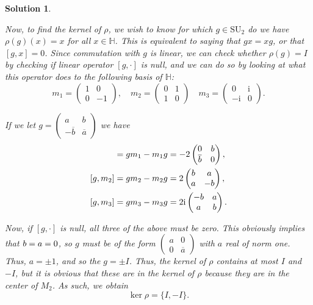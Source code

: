 \documentclass{article}
\theoremstyle{nonumberplain}
\newtheorem{sol}{Solution}
\newcommand{\I}{\mathrm{i}}
\newcommand{\conj}[1]{\overline{#1}}
\renewcommand{\lg}[1]{\mathrm{#1}}
\newcommand{\bbH}{\mathbb{H}}
\let\Im\relax
\DeclareMathOperator{\Im}{Im}
\let\Re\relax
\DeclareMathOperator{\Re}{Re}
\begin{document}
\begin{sol}
\begin{enumerate}
\smallskip

Now, to find the kernel of $\rho$, we wish to know for which $g \in \lg{SU}_2$ do we have $\rho(g)(x) = x$ for all $x \in \bbH$. This is equivalent to saying that $gx = xg$, or that $[g,x] = 0$. Since commutation with $g$ is linear, we can check whether $\rho(g) = I$ by checking if linear operator $[g,\cdot]$ is null, and we can do so by looking at what this operator does to the following basis of $\bbH$:
\begin{equation}
m_1 = \begin{pmatrix} 1 & 0 \\ 0 & -1 \end{pmatrix}, \quad m_2 = \begin{pmatrix}0&1\\1&0\end{pmatrix} \quad m_3 = \begin{pmatrix}0&\I\\-\I&0\end{pmatrix}.
\end{equation}

If we let $g = \left(\begin{smallmatrix} a & b \\ - \conj b & \conj a\end{smallmatrix}\right)$ we have
\begin{align}
[g, m_1] = g m_1 - m_1 g &= - 2 \begin{pmatrix} 0 & b \\ \conj b & 0 \end{pmatrix},\\
[g, m_2] = g m_2 - m_2 g &= 2 \begin{pmatrix} \Re b & \Im a \\  \Im a & - \Re b \end{pmatrix},\\
[g, m_3] = g m_3 - m_3 g &= 2 \I \begin{pmatrix} - \Im b & \Im a \\ \Im a & \Im b \end{pmatrix}.
\end{align}

Now, if $[g, \cdot]$ is null, all three of the above must be zero. This obviously implies that $b = \Im a = 0$, so $g$ must be of the form $\left( \begin{smallmatrix} a & 0 \\ 0 & \conj a \end{smallmatrix}\right)$ with $a$ real of norm one. Thus, $a = \pm 1$, and so the $g = \pm I$. Thus, the kernel of $\rho$ contains at most $I$ and $-I$, but it is obvious that these are in the kernel of $\rho$ because they are in the center of $M_2$. As such, we obtain
\begin{equation}
\ker \rho = \{I, -I\}.
\end{equation}


\end{enumerate}
\end{sol}
\end{document}

